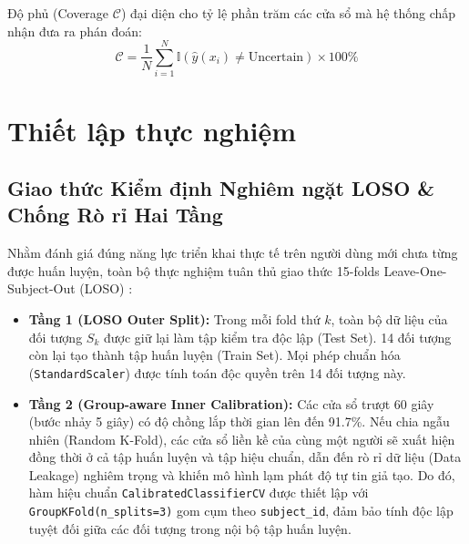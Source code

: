 \documentclass[conference]{IEEEtran}
\begin{document}
Độ phủ (Coverage $\mathcal{C}$) đại diện cho tỷ lệ phần trăm các cửa sổ mà hệ thống chấp nhận đưa ra phán đoán:
\begin{equation}
\mathcal{C} = \frac{1}{N} \sum_{i=1}^N \mathbb{I}(\hat{y}(x_i) \neq \text{Uncertain}) \times 100\%
\end{equation}

\section{Thiết lập thực nghiệm}

\subsection{Giao thức Kiểm định Nghiêm ngặt LOSO \& Chống Rò rỉ Hai Tầng}
Nhằm đánh giá đúng năng lực triển khai thực tế trên người dùng mới chưa từng được huấn luyện, toàn bộ thực nghiệm tuân thủ giao thức 15-folds Leave-One-Subject-Out (LOSO) \cite{saeb2017need, little2019using}:
\begin{itemize}
    \item \textbf{Tầng 1 (LOSO Outer Split):} Trong mỗi fold thứ $k$, toàn bộ dữ liệu của đối tượng $S_k$ được giữ lại làm tập kiểm tra độc lập (Test Set). 14 đối tượng còn lại tạo thành tập huấn luyện (Train Set). Mọi phép chuẩn hóa (\texttt{StandardScaler}) được tính toán độc quyền trên 14 đối tượng này.
    \item \textbf{Tầng 2 (Group-aware Inner Calibration):} Các cửa sổ trượt 60 giây (bước nhảy 5 giây) có độ chồng lắp thời gian lên đến 91.7\%. Nếu chia ngẫu nhiên (Random K-Fold), các cửa sổ liền kề của cùng một người sẽ xuất hiện đồng thời ở cả tập huấn luyện và tập hiệu chuẩn, dẫn đến rò rỉ dữ liệu (Data Leakage) nghiêm trọng và khiến mô hình lạm phát độ tự tin giả tạo. Do đó, hàm hiệu chuẩn \texttt{CalibratedClassifierCV} được thiết lập với \texttt{GroupKFold(n\_splits=3)} gom cụm theo \texttt{subject\_id}, đảm bảo tính độc lập tuyệt đối giữa các đối tượng trong nội bộ tập huấn luyện.
\end{itemize}
\end{document}
